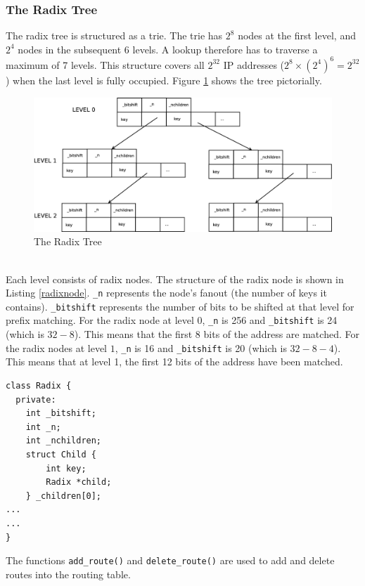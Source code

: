 \documentclass[a4paper,marginparwidth=50pt,marginparsep=10pt]{article}
\begin{document}
\subsubsection{The Radix Tree}
The radix tree is structured as a trie. The trie has  $2^8$ nodes at the first level, and $2^4$ nodes in the subsequent 6 levels. A lookup therefore has to traverse a maximum of 7 levels. This structure covers all $2^{32}$ IP addresses ($2^8\times(2^4)^6=2^{32}$) when the last level is fully occupied. Figure \ref{radixtree} shows the tree pictorially.\\
\begin{figure}[tph]
\begin{center}
\includegraphics[scale = 0.23]{../images/diagrams/radixtree2.eps}
\caption{The Radix Tree}
\label{radixtree}
\end{center}
\end{figure}
\\Each level consists of radix nodes. The structure of the radix node is shown in Listing \ref{radixnode}. \verb+_n+ represents the node's fanout (the number of keys it contains). \verb+_bitshift+ represents the number of bits to be shifted at that level for prefix matching. For the radix node at level 0, \verb+_n+ is 256 and \verb+_bitshift+ is 24 (which is $32 - 8$). This means that the first 8 bits of the address are matched. For the radix nodes at level $1$, \verb+_n+ is 16 and \verb+_bitshift+ is 20 (which is $32 -8 -4$). This means that at level 1, the first 12 bits of the address have been matched.
\begin{lstlisting}[float=tph, caption = The Radix Class, label=radixnode]
class Radix {
  private:
    int _bitshift;
    int _n;
    int _nchildren;
    struct Child {
        int key;
        Radix *child;
    } _children[0];
...
...
}
\end{lstlisting}
The functions \verb+add_route()+ and \verb+delete_route()+ are used to add and delete routes into the routing table.
\end{document}
